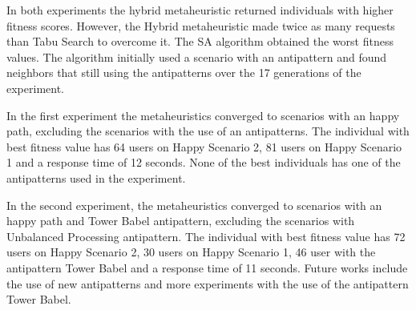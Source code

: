 In both experiments the hybrid metaheuristic returned individuals with higher fitness scores. However, the Hybrid metaheuristic made twice as many requests than Tabu Search to overcome it. The SA algorithm obtained the worst fitness values. The algorithm initially used a scenario with an antipattern and found neighbors that still using the antipatterns over the 17 generations of the experiment.

In the first experiment the metaheuristics converged to scenarios with an happy path, excluding the scenarios with the use of an antipatterns. The individual with best fitness value has 64 users on Happy Scenario 2, 81 users on Happy Scenario 1 and a response time of 12 seconds. None of the best individuals has one of the antipatterns used in the experiment.


In the second experiment,  the metaheuristics converged to scenarios with an happy path and Tower Babel antipattern, excluding the scenarios with Unbalanced Processing antipattern. The individual with best fitness value has 72 users on Happy Scenario 2, 30 users on Happy Scenario 1, 46 user with the antipattern Tower Babel and a response time of 11 seconds. Future works include the use of new antipatterns and more experiments with the use of the antipattern Tower Babel.

